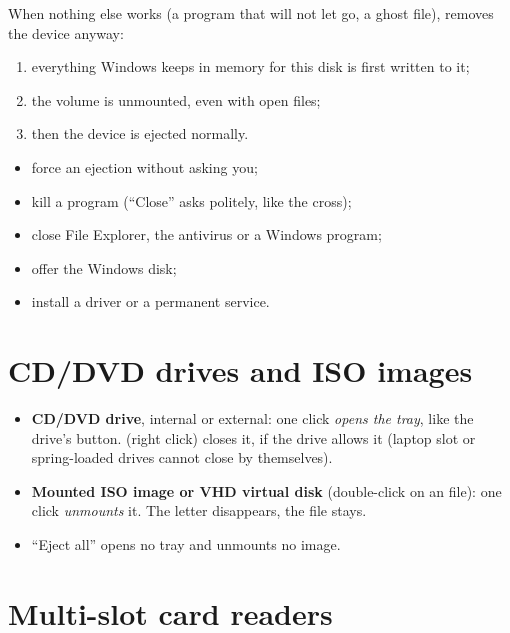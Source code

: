 When nothing else works (a program that will not let go, a ghost file),
 removes the device anyway:
\begin{enumerate}
\item everything Windows keeps in memory for this disk is first written to it;
\item the volume is unmounted, even with open files;
\item then the device is ejected normally.
\end{enumerate}


\begin{securitebox}
\begin{itemize}[leftmargin=4mm]
\item force an ejection without asking you;
\item kill a program (“Close” asks politely, like the cross);
\item close File Explorer, the antivirus or a Windows program;
\item offer the Windows disk;
\item install a driver or a permanent service.
\end{itemize}
\end{securitebox}

\section{CD/DVD drives and ISO images}
\begin{itemize}
\item \textbf{CD/DVD drive}, internal or external: one click \emph{opens the tray}, like the
  drive's button.  (right click) closes it, if the drive allows it
  (laptop slot or spring-loaded drives cannot close by themselves).
\item \textbf{Mounted ISO image or VHD virtual disk} (double-click on an  file):
  one click \emph{unmounts} it. The letter disappears, the file stays.
\item “Eject all” opens no tray and unmounts no image.
\end{itemize}

\section{Multi-slot card readers}

